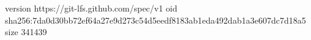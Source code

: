 version https://git-lfs.github.com/spec/v1
oid sha256:7da0d30bb72ef64a27e9d273c54d5eedf8183ab1eda492dab1a3e607dc7d18a5
size 341439
